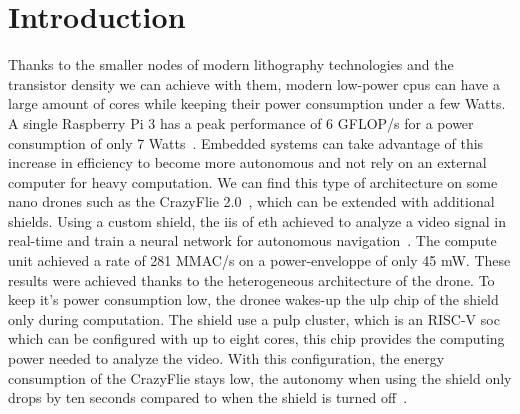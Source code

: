 
\chapter{Introduction}

    Thanks to the smaller nodes of modern lithography technologies and the transistor density we can achieve with them, modern low-power \glspl{cpu} can have a large amount of cores while keeping their power consumption under a few Watts. A single Raspberry Pi 3 has a peak performance of 6 \si{GFLOP/s} for a power consumption of only 7 Watts~\cite{Art:RpiClusters}.
    Embedded systems can take advantage of this increase in efficiency to become more autonomous and not rely on an external computer for heavy computation. We can find this type of architecture on some nano drones such as the CrazyFlie 2.0~\cite{Web:CrazyFlie20}, which can be extended with additional shields. Using a custom shield, the \gls{iis} of \acrshort{eth} achieved to analyze a video signal in real-time and train a neural network for autonomous navigation~\cite{Art:NanoDrone}. The compute unit achieved a rate of 281 \si{MMAC/s} on a power-enveloppe of only 45 \si{mW}.
	These results were achieved thanks to the heterogeneous architecture of the drone.
	To keep it's power consumption low, the dronee wakes-up the \gls{ulp} chip of the shield only during computation. 
 	The shield use a \gls{pulp} cluster, which is an RISC-V \gls{soc} which can be configured with up to eight cores, this chip provides the computing power needed to analyze the video. 
	With this configuration, the energy consumption of the CrazyFlie stays low, the autonomy when using the shield only drops by ten seconds compared to when the shield is turned off~\cite{Art:NanoDrones}.

